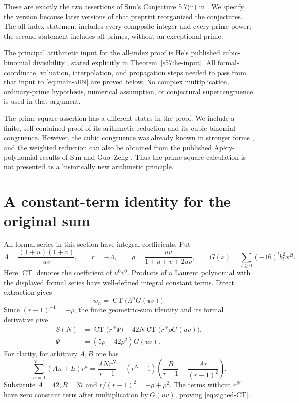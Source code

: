 \documentclass[11pt,a4paper]{article}
\numberwithin{equation}{section}
\theoremstyle{remark}
\newcommand{\CT}{\operatorname{CT}}
\begin{document}
These are exactly the two assertions of Sun's Conjecture 5.7(ii)
in \cite[Conjecture 5.7(ii), p.~32]{Sun2010v11}. We specify the
version because later versions of that preprint reorganized the
conjectures. The all-index statement includes every composite
integer and every prime power; the second statement includes all
primes, without an exceptional prime.

The principal arithmetic input for the all-index proof is He's
published cubic-binomial divisibility \cite{He2017}, stated explicitly
in Theorem~\ref{s57:he-input}. All formal-coordinate, valuation,
interpolation, and propagation steps needed to pass from that input
to \eqref{eq:main-allN} are proved below. No complex multiplication,
ordinary-prime hypothesis, numerical assumption, or conjectural
supercongruence is used in that argument.

The prime-square assertion has a different status in the proof.
We include a finite, self-contained proof of its arithmetic reduction
and its cubic-binomial congruence. However, the cubic congruence was
already known in stronger forms \cite{SunEuler2011}, and the
weighted reduction can also be obtained from the published
Ap\'ery-polynomial results of Sun and Guo--Zeng
\cite{SunApery2012,GuoZeng2012}. Thus the prime-square calculation
is not presented as a historically new arithmetic principle.

\section{A constant-term identity for the original sum}
\label{sec:constant-term}

All formal series in this section have integral coefficients. Put
\[
 \Lambda=\frac{(1+u)(1+v)}{uv},\qquad r=-\Lambda,
 \qquad \rho=\frac{uv}{1+u+v+2uv},
 \qquad G(x)=\sum_{l\ge0}(-16)^l b_l^2x^{2l}.
\]
Here \(\CT\) denotes the coefficient of \(u^0v^0\). Products of
a Laurent polynomial with the displayed formal series have
well-defined integral constant terms. Direct extraction gives
\[
                  w_n=\CT\bigl(\Lambda^nG(uv)\bigr).
\]
Since \((r-1)^{-1}=-\rho\), the finite geometric-sum identity and
its formal derivative give
\begin{align}
 S(N)&=\CT\bigl(r^N\Psi\bigr)
          -42N\CT\bigl(r^N\rho G(uv)\bigr),
          \label{eq:signed-CT}\\
 \Psi&=(5\rho-42\rho^2)G(uv).
          \label{eq:signed-Psi}
\end{align}
For clarity, for arbitrary \(A,B\) one has
\[
 \sum_{n=0}^{N-1}(An+B)r^n
 =\frac{ANr^N}{r-1}
  +(r^N-1)\left(\frac B{r-1}-\frac{Ar}{(r-1)^2}\right).
\]
Substitute \(A=42,B=37\) and
\(r/(r-1)^2=-\rho+\rho^2\). The terms without \(r^N\) have
zero constant term after multiplication by \(G(uv)\), proving
\eqref{eq:signed-CT}.
\end{document}
